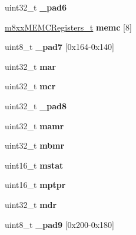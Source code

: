 \begin{DoxyCompactItemize}
\item 
\mbox{\label{structm8xx___af15da7c6a88cecabe627e1ad29377ee2}} 
uint32\+\_\+t {\bfseries \+\_\+pad6}
\item 
\mbox{\label{structm8xx___a8939f25b1723f84b4bb08b1219043c86}} 
\mbox{\hyperlink{structm8xxMEMCRegisters__}{m8xx\+M\+E\+M\+C\+Registers\+\_\+t}} {\bfseries memc} \mbox{[}8\mbox{]}
\item 
\mbox{\label{structm8xx___a76db0db53488d11b7a8f997ae65ce14f}} 
uint8\+\_\+t {\bfseries \+\_\+pad7} \mbox{[}0x164-\/0x140\mbox{]}
\item 
\mbox{\label{structm8xx___a7930172185dce48f45f9ed8225bf9b8e}} 
uint32\+\_\+t {\bfseries mar}
\item 
\mbox{\label{structm8xx___a7bbdfde2055d75ea404087e22c0ffc1b}} 
uint32\+\_\+t {\bfseries mcr}
\item 
\mbox{\label{structm8xx___a5478a572ddb4790b5c23282d8fad3087}} 
uint32\+\_\+t {\bfseries \+\_\+pad8}
\item 
\mbox{\label{structm8xx___ae32e45b9cc582ae290d8f17e23aa4905}} 
uint32\+\_\+t {\bfseries mamr}
\item 
\mbox{\label{structm8xx___a5deb369b84166f736b1b074cfa8c1d5b}} 
uint32\+\_\+t {\bfseries mbmr}
\item 
\mbox{\label{structm8xx___a68e919014fb5b6ed8f9236b33b37309b}} 
uint16\+\_\+t {\bfseries mstat}
\item 
\mbox{\label{structm8xx___a666fdd450de903e35c1e28ae740417c1}} 
uint16\+\_\+t {\bfseries mptpr}
\item 
\mbox{\label{structm8xx___a8fb3532fcb509ccda515193669bf1c5a}} 
uint32\+\_\+t {\bfseries mdr}
\item 
\mbox{\label{structm8xx___a039aa80f114c5b9a214bf7a5ad811a31}} 
uint8\+\_\+t {\bfseries \+\_\+pad9} \mbox{[}0x200-\/0x180\mbox{]}
\item 

\end{DoxyCompactItemize}
